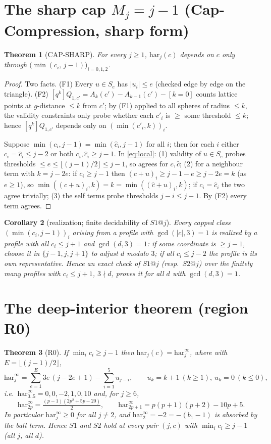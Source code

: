 \documentclass[11pt]{article}
\newtheorem{theorem}{Theorem}[section]
\newtheorem{corollary}[theorem]{Corollary}
\theoremstyle{definition}
\theoremstyle{remark}
\newcommand{\har}{\mathrm{har}}
\newcommand{\haru}{\har^{\infty}}
\begin{document}
\section{The sharp cap $M_j=j-1$ (Cap-Compression, sharp form)}

\begin{theorem}[CAP-SHARP]\label{thm:cap}
For every $j\ge1$, $\har_j(c)$ depends on $c$ only through
$\bigl(\min(c_i,\,j-1)\bigr)_{i=0,1,2}$.
\end{theorem}

\begin{proof}
Two facts. (F1) Every $u\in S_e$ has $|u_i|\le e$ (checked edge by edge on
the triangle). (F2) $[q^k]Q_{1,c'}=A_k(c')-A_{k-1}(c')-[k{=}0]$ counts
lattice points at $g$-distance $\le k$ from $c'$; by (F1) applied to all
spheres of radius $\le k$, the validity constraints only probe whether each
$c'_i$ is $\ge$ some threshold $\le k$; hence $[q^k]Q_{1,c'}$ depends only on
$(\min(c'_i,k))_i$.

Suppose $\min(c_i,j-1)=\min(\hat c_i,j-1)$ for all $i$; then for each $i$
either $c_i=\hat c_i\le j-2$ or both $c_i,\hat c_i\ge j-1$. In
\eqref{eq:local}: (1) validity of $u\in S_e$ probes thresholds
$\le e\le\lfloor(j-1)/2\rfloor\le j-1$, so agrees for $c,\hat c$;
(2) for a neighbour term with $k=j-2e$: if $c_i\ge j-1$ then
$(c+u)_i\ge j-1-e\ge j-2e=k$ (as $e\ge1$), so
$\min((c+u)_i,k)=k=\min((\hat c+u)_i,k)$; if $c_i=\hat c_i$ the two agree
trivially; (3) the self terms probe thresholds $j-i\le j-1$.
By (F2) every term agrees.
\end{proof}

\begin{corollary}[realization; finite decidability of $S1@j$]\label{cor:cap}
Every capped class $(\min(c_i,j-1))_i$ arising from a profile with
$\gcd(|c|,3)=1$ is realized by a profile with all $c_i\le j+1$ and
$\gcd(d,3)=1$: if some coordinate is $\ge j-1$, choose it in
$\{j-1,j,j+1\}$ to adjust $d$ modulo $3$; if all $c_i\le j-2$ the profile is
its own representative. Hence an exact check of $S1@j$ (resp.\ $S2@j$) over
the finitely many profiles with $c_i\le j+1$, $3\nmid d$, proves it for
\emph{all} $d$ with $\gcd(d,3)=1$.
\end{corollary}

\section{The deep-interior theorem (region R0)}

\begin{theorem}[R0]\label{thm:r0}
If $\min_i c_i\ge j-1$ then $\har_j(c)=\haru_j$, where with
$E=\lfloor(j-1)/2\rfloor$,
\[
\haru_j=\sum_{e=1}^{E}3e\,(j-2e+1)-\sum_{i=1}^{5}u_{j-i},
\qquad u_k=k+1\ (k\ge1),\ u_k=0\ (k\le0),
\]
i.e.\ $\haru_{0..5}=0,0,-2,1,0,10$ and, for $j\ge6$,
\[
\haru_{2p}=\tfrac{(p-1)(2p^2+5p-20)}{2},
\qquad
\haru_{2p+1}=p(p+1)(p+2)-10p+5 .
\]
In particular $\haru_j\ge0$ for all $j\ne2$, and $\haru_2=-2=-(b_1-1)$ is
absorbed by the ball term. Hence $S1$ and $S2$ hold at \emph{every} pair
$(j,c)$ with $\min_i c_i\ge j-1$ (all $j$, all $d$).
\end{theorem}
\end{document}
